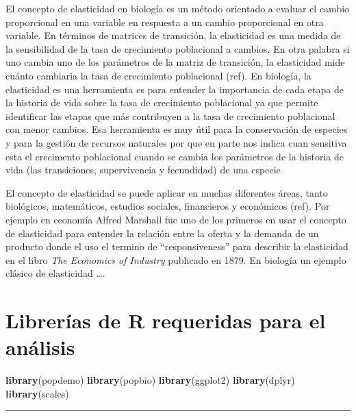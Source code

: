 \documentclass[
]{book}
\newenvironment{Shaded}{\begin{snugshade}}{\end{snugshade}}
\newcommand{\FunctionTok}[1]{\textcolor[rgb]{0.13,0.29,0.53}{\textbf{#1}}}
\newcommand{\NormalTok}[1]{#1}
\theoremstyle{definition}
\theoremstyle{definition}
\theoremstyle{definition}
\theoremstyle{definition}
\theoremstyle{remark}
\begin{document}
El concepto de elasticidad en biología es un método orientado a evaluar el cambio proporcional en una variable en respuesta a un cambio proporcional en otra variable. En términos de matrices de transición, la elasticidad es una medida de la sensibilidad de la tasa de crecimiento poblacional a cambios. En otra palabra si uno cambia uno de los parámetros de la matriz de transición, la elasticidad mide cuánto cambiaria la tasa de crecimiento poblacional (ref). En biología, la elasticidad es una herramienta es para entender la importancia de cada etapa de la historia de vida sobre la tasa de crecimiento poblacional ya que permite identificar las etapas que más contribuyen a la tasa de crecimiento poblacional con menor cambios. Esa herramienta es muy útil para la conservación de especies y para la gestión de recursos naturales por que en parte nos indica cuan sensitiva esta el crecimento poblacional cuando se cambia los parámetros de la historia de vida (las transiciones, supervivencia y fecundidad) de una especie

El concepto de elasticidad se puede aplicar en muchas diferentes áreas, tanto biológicos, matemáticos, estudios sociales, financieros y económicos (ref). Por ejemplo en economía Alfred Marshall fue uno de los primeros en usar el concepto de elasticidad para entender la relación entre la oferta y la demanda de un producto donde el uso el termino de ``responsiveness'' para describir la elasticidad en el libro \emph{The Economics of Industry} publicado en 1879. En biología un ejemplo clásico de elasticidad \ldots.

\section{Librerías de R requeridas para el análisis}\label{libreruxedas-de-r-requeridas-para-el-anuxe1lisis-1}

\begin{Shaded}
\begin{Highlighting}[]
\FunctionTok{library}\NormalTok{(popdemo)}
\FunctionTok{library}\NormalTok{(popbio)}
\FunctionTok{library}\NormalTok{(ggplot2)}
\FunctionTok{library}\NormalTok{(dplyr)}
\FunctionTok{library}\NormalTok{(scales)}
\end{Highlighting}
\end{Shaded}

\begin{center}\rule{0.5\linewidth}{0.5pt}\end{center}
\end{document}
